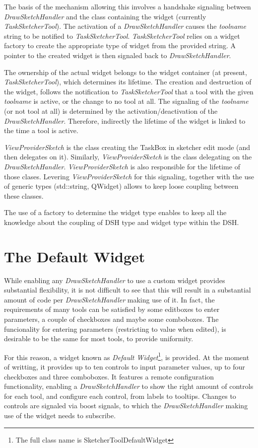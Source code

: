 \documentclass[12pt,twoside,a4paper]{book}
\newcommand{\DrawSketchHandler}{\emph{DrawSketchHandler}}
\newcommand{\ViewProviderSketch}{\emph{ViewProviderSketch}}
\begin{document}
    The basis of the mechanism allowing this involves a handshake signaling between \DrawSketchHandler{} and the class containing the widget (currently \emph{TaskSketcherTool}). The activation of a \emph{DrawSketchHandler} causes the \emph{toolname} string to be notified to \emph{TaskSketcherTool}. \emph{TaskSketcherTool} relies on a widget factory to create the appropriate type of widget from the provided string. A pointer to the created widget is then signaled back to \emph{DrawSketchHandler}.

    The ownership of the actual widget belongs to the widget container (at present, \emph{TaskSketcherTool}), which determines its lifetime. The creation and destruction of the widget, follows the notification to \emph{TaskSketcherTool} that a tool with the given \emph{toolname} is active, or the change to no tool at all. The signaling of the \emph{toolname} (or not tool at all) is determined by the activation/deactivation of the \DrawSketchHandler{}. Therefore, indirectly the lifetime of the widget is linked to the time a tool is active.

    \ViewProviderSketch{} is the class creating the TaskBox in sketcher edit mode (and then delegates on it). Similarly, \ViewProviderSketch{} is the class delegating on the \DrawSketchHandler{}. \ViewProviderSketch{} is also responsible for the lifetime of those clases. Levering \ViewProviderSketch{} for this signaling, together with the use of generic types (std::string, QWidget) allows to keep loose coupling between these classes.

    The use of a factory to determine the widget type enables to keep all the knowledge about the coupling of DSH type and widget type within the DSH.

    \section{The Default Widget}

    While enabling any \DrawSketchHandler{} to use a custom widget provides substantial flexibility, it is not difficult to see that this will result in a substantial amount of code per \DrawSketchHandler{} making use of it. In fact, the requirements of many tools can be satisfied by some editboxes to enter parameters, a couple of checkboxes and maybe some comboboxes. The funcionality for entering parameters (restricting to value when edited), is desirable to be the same for most tools, to provide uniformity.

    For this reason, a widget known as \emph{Default Widget}\footnote{The full class name is SketcherToolDefaultWidget}, is provided. At the moment of writting, it provides up to ten controls to input parameter values, up to four checkboxes and three comboboxes. It features a remote configuration functionality, enabling a \DrawSketchHandler{} to show the right amount of controls for each tool, and configure each control, from labels to tooltips. Changes to controls are signaled via boost signals, to which the \DrawSketchHandler{} making use of the widget needs to subscribe.
\end{document}
